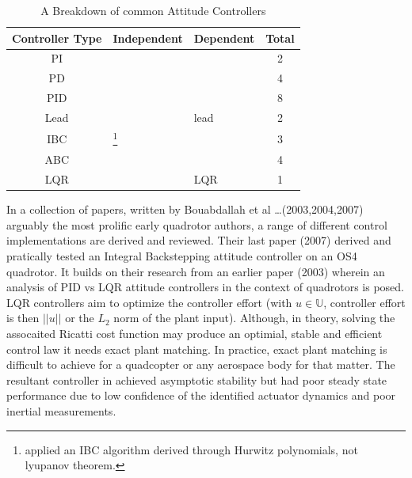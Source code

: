 \begin{table}[h]
\centering
\begin{tabular}{ |c|l|l|c| }
\hline
Controller Type & Independent & Dependent & Total\\ \hline
PI & \cite{attitudecontrolproblem} & \cite{attitudecontrolproblem} & 2\\ \hline
PD & \cite{modelingquadcopter, tiltrihani} & \cite{fullquaternion,singleaxistilting} & 4\\ \hline
PID & \cite{optimizedpidquadcopter, attitudecontrolproblem, quaddynamics, tiltpropellercontrol, pidlqr} & \cite{attitudecontrolproblem, starmac, adaptivedisturbancecontrol} & 8\\ \hline
Lead & \cite{x4flyer, dynamicmodelling2009} & lead & 2\\ \hline
IBC & \cite{tpheonix, backsteppingquadcoptercontrol}\footnote{\cite{tpheonix} applied an IBC algorithm derived through Hurwitz polynomials, not lyupanov theorem.} & \cite{backsteppingquadcoptercontrol} & 3\\ \hline
ABC & \multicolumn{2}{l|}{\cite{adaptivebackstep, nonlinearadaptive, 6dofbackstep, intelligentbackstep}} & 4\\ \hline
LQR & \cite{pidlqr} & LQR & 1\\ \hline
\end{tabular}
\caption{A Breakdown of common Attitude Controllers}
\label{tab:controllers}
\end{table}
\par
In a collection of papers, written by Bouabdallah et al \ldots (2003,2004,2007) arguably the most prolific early quadrotor authors, a range of different control implementations are derived and reviewed. Their last paper (2007)\cite{fullquadcoptercontrol} derived and pratically tested an Integral Backstepping attitude controller on an OS4 quadrotor. It builds on their research from an earlier paper (2003)\cite{pidlqr} wherein an analysis of PID vs LQR attitude controllers in the context of quadrotors is posed. LQR controllers aim to optimize the controller effort (with $u\in\mathbb{U}$, controller effort is then $||u||$ or the $L_2$ norm of the plant input). Although, in theory, solving the assocaited Ricatti cost function may produce an optimial, stable and efficient control law it needs exact plant matching. In practice, exact plant matching is difficult to achieve for a quadcopter or any aerospace body for that matter. The resultant controller in \cite{pidlqr} achieved asymptotic stability but had poor steady state performance due to low confidence of the identified actuator dynamics and poor inertial measurements.
